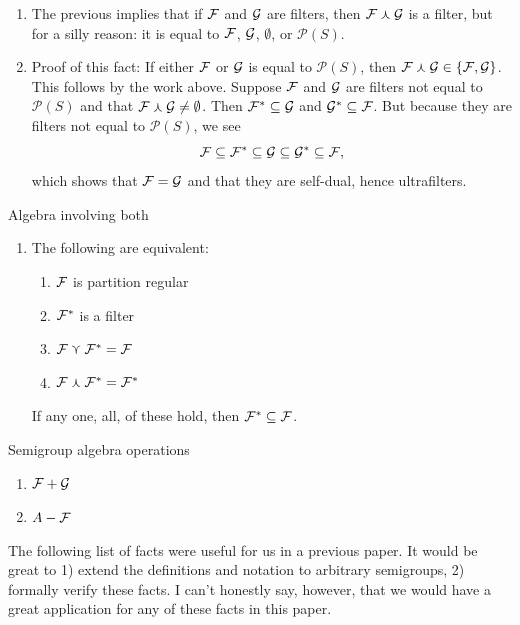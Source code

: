 \begin{enumerate}
\begin{enumerate}
        \item The previous implies that if $\mathcal{F}$ and $\mathcal{G}$ are filters, then $\mathcal{F} \curlywedge \mathcal{G}$ is a filter, but for a silly reason: it is equal to $\mathcal{F}$, $\mathcal{G}$, $\emptyset$, or $\mathcal{P}(S)$.
        
        \item Proof of this fact: If either $\mathcal{F}$ or $\mathcal{G}$ is equal to $\mathcal{P}(S)$, then $\mathcal{F} \curlywedge \mathcal{G} \in \{\mathcal{F}, \mathcal{G}\}$.  This follows by the work above.  Suppose $\mathcal{F}$ and $\mathcal{G}$ are filters not equal to $\mathcal{P}(S)$ and that $\mathcal{F} \curlywedge \mathcal{G} \neq \emptyset$. Then $\mathcal{F}^* \subseteq \mathcal{G}$ and $\mathcal{G}^* \subseteq \mathcal{F}$.  But because they are filters not equal to $\mathcal{P}(S)$, we see
        \[\mathcal{F} \subseteq \mathcal{F}^* \subseteq \mathcal{G} \subseteq \mathcal{G}^* \subseteq \mathcal{F},\]
        which shows that $\mathcal{F} = \mathcal{G}$ and that they are self-dual, hence ultrafilters.
    \end{enumerate}
\end{enumerate}

Algebra involving both
\begin{enumerate}
    \item {} The following are equivalent: 
    \begin{enumerate}
        \item $\mathcal{F}$ is partition regular
        \item $\mathcal{F}^*$ is a filter
        \item $\mathcal{F} \curlyvee \mathcal{F}^* = \mathcal{F}$
        \item $\mathcal{F} \curlywedge \mathcal{F}^* = \mathcal{F}^*$
    \end{enumerate}
    If any one, all, of these hold, then $\mathcal{F}^* \subseteq \mathcal{F}$.
\end{enumerate}

Semigroup algebra operations
\begin{enumerate}
    \item $\mathcal{F} + \mathcal{G}$
    \item $A - \mathcal{F}$
\end{enumerate}
\vskip0.5cm


The following list of facts were useful for us in a previous paper.  It would be great to 1) extend the definitions and notation to arbitrary semigroups, 2) formally verify these facts.  I can't honestly say, however, that we would have a great application for any of these facts in this paper.

